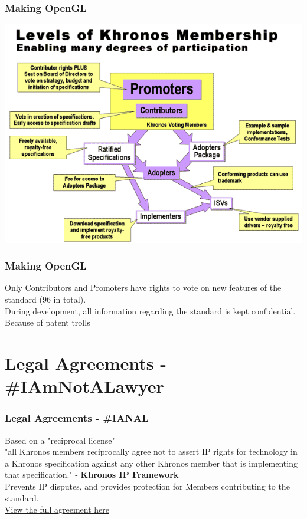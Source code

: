 \documentclass[10pt, compress]{beamer}
\begin{document}
\begin{frame}[fragile]
    \frametitle{Making OpenGL}
  \includegraphics[width=\textwidth]{levels_of_membership}
\end{frame}


\begin{frame}[fragile]
    \frametitle{Making OpenGL}
    \begin{center}Only Contributors and Promoters have rights to vote on new features of the standard (96 in total).
    \\  \vspace{3mm}
    During development, all information regarding the standard is kept confidential.
    \\  \vspace{3mm}
    Because of patent trolls
    \end{center}
\end{frame}

\section{Legal Agreements - \#IAmNotALawyer}

\begin{frame}[fragile]
    \frametitle{Legal Agreements - \#IANAL}
    Based on a "reciprocal license"
    \\  \vspace{3mm}
    "all Khronos members reciprocally agree not to assert IP rights for technology in a Khronos specification against any other Khronos member that is implementing that specification." - \textbf{Khronos IP Framework}
    \\ \vspace{3mm}
    Prevents IP disputes, and provides protection for Members contributing to the standard.
    \\ \vspace{3mm}
    \href{https://www.khronos.org/files/member_agreement.pdf}{\alert{View the full agreement here}}
\end{frame}
\end{document}
